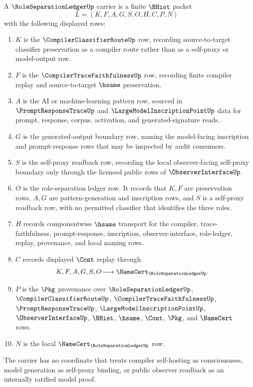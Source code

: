 \begin{definition}
\label{def:role-separation-ledger-carrier}
A $\RoleSeparationLedgerUp$ carrier is a finite $\BHist$ packet
$$
L=(K,F,A,G,S,O,H,C,P,N)
$$
with the following displayed rows:
\begin{enumerate}
\item $K$ is the $\CompilerClassifierRouteUp$ row, recording source-to-target classifier preservation as a compiler route rather than as a self-proxy or model-output row.
\item $F$ is the $\CompilerTraceFaithfulnessUp$ row, recording finite compiler replay and source-to-target $\hsame$ preservation.
\item $A$ is the AI or machine-learning pattern row, sourced in $\PromptResponseTraceUp$ and $\LargeModelInscriptionPointUp$ data for prompt, response, corpus, activation, and generated-signature reads.
\item $G$ is the generated-output boundary row, naming the model-facing inscription and prompt-response rows that may be inspected by audit consumers.
\item $S$ is the self-proxy readback row, recording the local observer-facing self-proxy boundary only through the licensed public rows of $\ObserverInterfaceUp$.
\item $O$ is the role-separation ledger row. It records that $K,F$ are preservation rows, $A,G$ are pattern-generation and inscription rows, and $S$ is a self-proxy readback row, with no permitted classifier that identifies the three roles.
\item $H$ records componentwise $\hsame$ transport for the compiler, trace-faithfulness, prompt-response, inscription, observer-interface, role-ledger, replay, provenance, and local naming rows.
\item $C$ records displayed $\Cont$ replay through
$$
K,F,A,G,S,O \longmapsto \NameCert_{\RoleSeparationLedgerUp}.
$$
\item $P$ is the $\Pkg$ provenance over $\RoleSeparationLedgerUp$, $\CompilerClassifierRouteUp$, $\CompilerTraceFaithfulnessUp$, $\PromptResponseTraceUp$, $\LargeModelInscriptionPointUp$, $\ObserverInterfaceUp$, $\BHist$, $\hsame$, $\Cont$, $\Pkg$, and $\NameCert$ rows.
\item $N$ is the local $\NameCert_{\RoleSeparationLedgerUp}$ row.
\end{enumerate}
The carrier has no coordinate that treats compiler self-hosting as consciousness, model generation as self-proxy binding, or public observer readback as an internally ratified model proof.
\end{definition}

